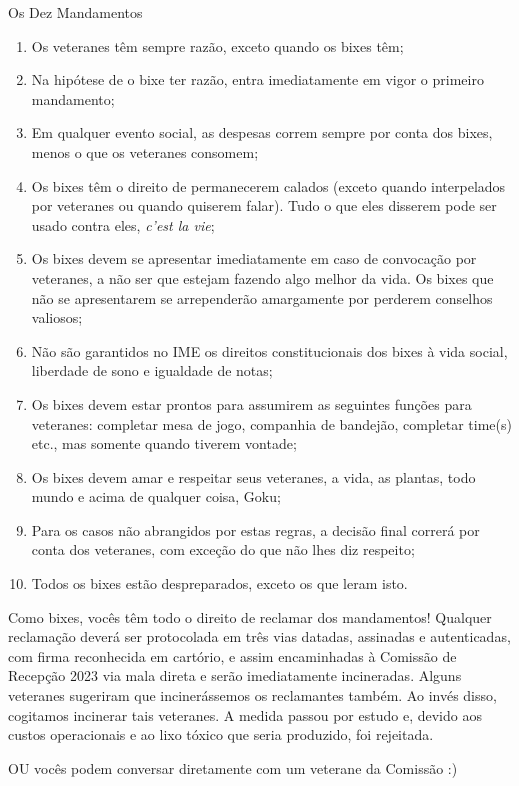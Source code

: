 \begin{editorial}{Os Dez Mandamentos}

\begin{enumerate}
  \item Os veteranes têm sempre razão, exceto quando os bixes têm;
  \item Na hipótese de o bixe ter razão, entra imediatamente em vigor
        o primeiro mandamento;
  \item Em qualquer evento social, as despesas correm sempre por conta dos
        bixes, menos o que os veteranes consomem;
  \item Os bixes têm o direito de permanecerem calados (exceto quando
        interpelados por veteranes ou quando quiserem falar). Tudo o que eles
        disserem pode ser usado contra eles, \textit{c’est la vie};
  \item Os bixes devem se apresentar imediatamente em caso de convocação por
        veteranes, a não ser que estejam fazendo algo melhor da vida. Os bixes
        que não se apresentarem se arrependerão amargamente por perderem
        conselhos valiosos; %
  \item Não são garantidos no IME os direitos constitucionais dos bixes à vida
        social, liberdade de sono e igualdade de notas;
  \item Os bixes devem estar prontos para assumirem as seguintes funções para
        veteranes: completar mesa de jogo, companhia de bandejão, completar
        time(s) etc., mas somente quando tiverem vontade;
  \item Os bixes devem amar e respeitar seus veteranes, a vida, as plantas,
        todo mundo e acima de qualquer coisa, Goku;
  \item Para os casos não abrangidos por estas regras, a decisão final correrá
        por conta dos veteranes, com exceção do que não lhes diz respeito;
  \item Todos os bixes estão despreparados, exceto os que leram isto.
\end{enumerate}

Como bixes, vocês têm todo o direito de reclamar dos mandamentos! 
Qualquer reclamação deverá ser protocolada em três vias datadas, assinadas e
autenticadas, com firma reconhecida em cartório, e assim encaminhadas à
Comissão de Recepção 2023 %
via mala direta e serão imediatamente incineradas. Alguns veteranes sugeriram
que incinerássemos os reclamantes também. Ao invés disso, cogitamos incinerar
tais veteranes. A medida passou por estudo e, devido aos custos operacionais e
ao lixo tóxico que seria produzido, foi rejeitada.

OU vocês podem conversar diretamente com um veterane da Comissão :)

\end{editorial}
